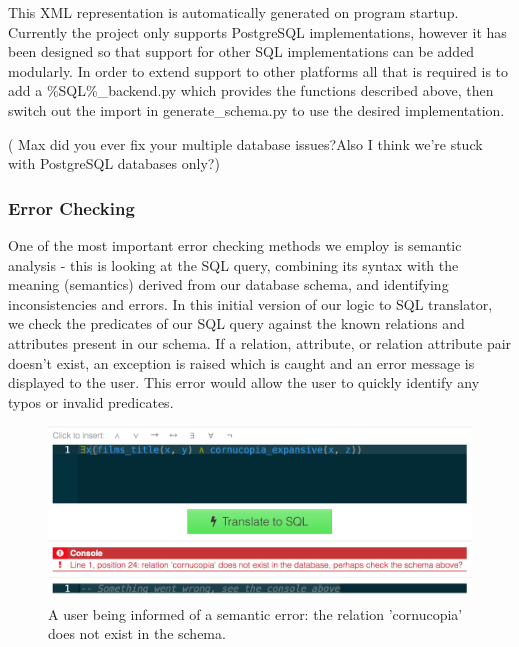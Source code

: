 \documentclass[a4paper, 11pt]{article}
\begin{document}
      This XML representation is automatically generated on program startup. 
      Currently the project only supports PostgreSQL implementations, however it 
      has been designed so that support for other SQL implementations can be 
      added modularly. In order to extend support to other platforms all that is  
      required is to add a \%SQL\%\_backend.py which provides the functions
      described above, then switch out the import in generate\_schema.py to use
      the desired implementation.


      ( Max did you ever fix your multiple database issues?Also I think we're
      stuck with PostgreSQL databases only?) 

      \subsubsection{Error Checking}


      One of the most important error checking methods we employ is semantic
      analysis - this is looking at the SQL query, combining its syntax with
      the meaning (semantics) derived from our database schema, and identifying
      inconsistencies and errors. In this initial version of our logic to SQL
      translator, we check the predicates of our SQL query against the known
      relations and attributes present in our schema. If a relation, attribute,
      or relation attribute pair doesn't exist, an exception is raised which is
      caught and an error message is displayed to the user. This error would
      allow the user to quickly identify any typos or invalid predicates.

      \begin{figure}[h!]
        \centering
        \includegraphics[width=1.0\textwidth]{images/error.png}
        \caption{A user being informed of a semantic error: the relation
          'cornucopia' does not exist in the schema.}
      \end{figure}
\end{document}

